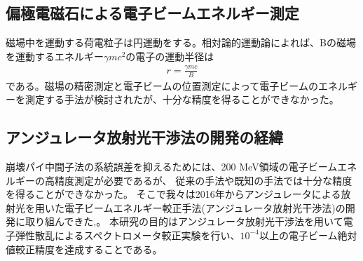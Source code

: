 \documentclass[a4paper,11pt,uplatex]{jsbook}
\begin{document}
\subsection{偏極電磁石による電子ビームエネルギー測定}
磁場中を運動する荷電粒子は円運動をする。相対論的運動論によれば、Bの磁場を運動するエネルギー$\gamma mc^2$の電子の運動半径は
\begin{eqnarray}
  r = \frac{\gamma mc}{B}
\end{eqnarray}
である。磁場の精密測定と電子ビームの位置測定によって電子ビームのエネルギーを測定する手法が検討されたが、十分な精度を得ることができなかった。
\subsection{アンジュレータ放射光干渉法の開発の経緯}
崩壊パイ中間子法の系統誤差を抑えるためには、200 MeV領域の電子ビームエネルギーの高精度測定が必要であるが、
従来の手法や既知の手法では十分な精度を得ることができなかった。
そこで我々は2016年からアンジュレータによる放射光を用いた電子ビームエネルギー較正手法(アンジュレータ放射光干渉法)の開発に取り組んできた\cite{klag2018},\cite{klag2023}。
本研究の目的はアンジュレータ放射光干渉法を用いて電子弾性散乱によるスペクトロメータ較正実験を行い、$10^{-4}$以上の電子ビーム絶対値較正精度を達成することである。

\end{document}

